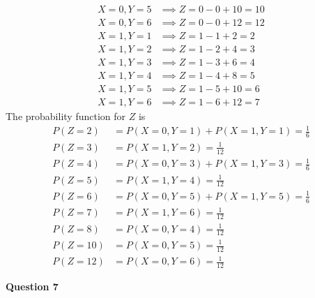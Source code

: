 \documentclass{uofa-eng-assignment}
\begin{document}
\begin{enumerate}
\begin{enumerate}
\begin{align*}
                      X = 0, Y = 5 & \implies Z = 0 - 0 + 10 = 10 \\
                      X = 0, Y = 6 & \implies Z = 0 - 0 + 12 = 12 \\
                      X = 1, Y = 1 & \implies Z = 1 - 1 + 2 = 2   \\
                      X = 1, Y = 2 & \implies Z = 1 - 2 + 4 = 3   \\
                      X = 1, Y = 3 & \implies Z = 1 - 3 + 6 = 4   \\
                      X = 1, Y = 4 & \implies Z = 1 - 4 + 8 = 5   \\
                      X = 1, Y = 5 & \implies Z = 1 - 5 + 10 = 6  \\
                      X = 1, Y = 6 & \implies Z = 1 - 6 + 12 = 7
                  \end{align*}
                  The probability function for $Z$ is
                  \begin{align*}
                      P(Z = 2)  & = P(X = 0, Y = 1) + P(X = 1, Y = 1) = \frac{1}{6} \\
                      P(Z = 3)  & = P(X = 1, Y = 2) = \frac{1}{12}                  \\
                      P(Z = 4)  & = P(X = 0, Y = 3) + P(X = 1, Y = 3) = \frac{1}{6} \\
                      P(Z = 5)  & = P(X = 1, Y = 4) = \frac{1}{12}                  \\
                      P(Z = 6)  & = P(X = 0, Y = 5) + P(X = 1, Y = 5) = \frac{1}{6} \\
                      P(Z = 7)  & = P(X = 1, Y = 6) = \frac{1}{12}                  \\
                      P(Z = 8)  & = P(X = 0, Y = 4) = \frac{1}{12}                  \\
                      P(Z = 10) & = P(X = 0, Y = 5) = \frac{1}{12}                  \\
                      P(Z = 12) & = P(X = 0, Y = 6) = \frac{1}{12}
                  \end{align*}
        \end{enumerate}
        \textbf{Question 7} \\

\end{enumerate}
\end{document}
